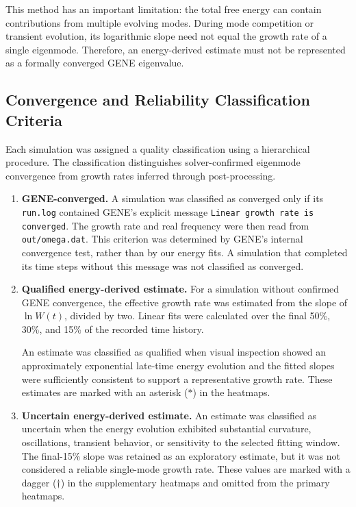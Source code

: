 \documentclass[10pt,letterpaper]{article}
\begin{document}
This method has an important limitation:
the total free energy can contain contributions
from multiple evolving modes. During mode
competition or transient evolution, its logarithmic
slope need not equal the growth rate of a single
eigenmode. Therefore, an energy-derived estimate
must not be represented as a formally converged
GENE eigenvalue.


\subsection{Convergence and Reliability Classification Criteria}

Each simulation was assigned a quality classification
using a hierarchical procedure. The classification
distinguishes solver-confirmed eigenmode convergence
from growth rates inferred through post-processing.

\begin{enumerate}[label=\textbf{\arabic*.},leftmargin=*]

\item \textbf{GENE-converged.}
A simulation was classified as converged only if
its \texttt{run.log} contained GENE's explicit
message \texttt{Linear growth rate is converged}.
The growth rate and real frequency were then
read from \texttt{out/omega.dat}.
This criterion was determined by GENE's internal
convergence test, rather than by our energy fits.
A simulation that completed its time steps without
this message was not classified as converged.

\item \textbf{Qualified energy-derived estimate.}
For a simulation without confirmed GENE convergence,
the effective growth rate was estimated from the
slope of $\ln W(t)$, divided by two.
Linear fits were calculated over the final
50\%, 30\%, and 15\% of the recorded time history.

An estimate was classified as qualified when
visual inspection showed an approximately
exponential late-time energy evolution and
the fitted slopes were sufficiently consistent
to support a representative growth rate.
These estimates are marked with an asterisk
($*$) in the heatmaps.

\item \textbf{Uncertain energy-derived estimate.}
An estimate was classified as uncertain when
the energy evolution exhibited substantial
curvature, oscillations, transient behavior,
or sensitivity to the selected fitting window.
The final-15\% slope was retained as an
exploratory estimate, but it was not considered
a reliable single-mode growth rate.
These values are marked with a dagger
($\dagger$) in the supplementary heatmaps
and omitted from the primary heatmaps.

\end{enumerate}
\end{document}
